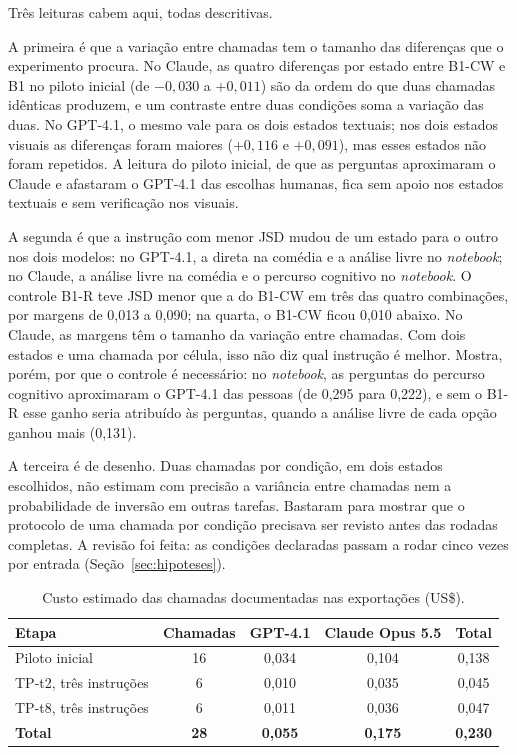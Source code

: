 \documentclass[12pt,oneside,a4paper,chapter=TITLE,english,brazil]{abntex2}
\begin{document}
Três leituras cabem aqui, todas descritivas.

A primeira é que a variação entre chamadas tem o tamanho das diferenças que o experimento procura. No Claude, as quatro diferenças por estado entre B1-CW e B1 no piloto inicial (de $-0{,}030$ a $+0{,}011$) são da ordem do que duas chamadas idênticas produzem, e um contraste entre duas condições soma a variação das duas. No GPT-4.1, o mesmo vale para os dois estados textuais; nos dois estados visuais as diferenças foram maiores ($+0{,}116$ e $+0{,}091$), mas esses estados não foram repetidos. A leitura do piloto inicial, de que as perguntas aproximaram o Claude e afastaram o GPT-4.1 das escolhas humanas, fica sem apoio nos estados textuais e sem verificação nos visuais.

A segunda é que a instrução com menor JSD mudou de um estado para o outro nos dois modelos: no GPT-4.1, a direta na comédia e a análise livre no \textit{notebook}; no Claude, a análise livre na comédia e o percurso cognitivo no \textit{notebook}. O controle B1-R teve JSD menor que a do B1-CW em três das quatro combinações, por margens de 0,013 a 0,090; na quarta, o B1-CW ficou 0,010 abaixo. No Claude, as margens têm o tamanho da variação entre chamadas. Com dois estados e uma chamada por célula, isso não diz qual instrução é melhor. Mostra, porém, por que o controle é necessário: no \textit{notebook}, as perguntas do percurso cognitivo aproximaram o GPT-4.1 das pessoas (de 0,295 para 0,222), e sem o B1-R esse ganho seria atribuído às perguntas, quando a análise livre de cada opção ganhou mais (0,131).

A terceira é de desenho. Duas chamadas por condição, em dois estados escolhidos, não estimam com precisão a variância entre chamadas nem a probabilidade de inversão em outras tarefas. Bastaram para mostrar que o protocolo de uma chamada por condição precisava ser revisto antes das rodadas completas. A revisão foi feita: as condições declaradas passam a rodar cinco vezes por entrada (Seção~\ref{sec:hipoteses}).

\begin{table}[htb]
\centering
\caption{Custo estimado das chamadas documentadas nas exportações (US\$).}
\label{tab:custos}
\footnotesize
\begin{tabular}{@{}lcccc@{}}
\toprule
\textbf{Etapa} & \textbf{Chamadas} & \textbf{GPT-4.1} & \textbf{Claude Opus 5.5} & \textbf{Total} \\
\midrule
Piloto inicial & 16 & 0,034 & 0,104 & 0,138 \\
TP-t2, três instruções & 6 & 0,010 & 0,035 & 0,045 \\
TP-t8, três instruções & 6 & 0,011 & 0,036 & 0,047 \\
\textbf{Total} & \textbf{28} & \textbf{0,055} & \textbf{0,175} & \textbf{0,230} \\
\bottomrule
\end{tabular}
\end{table}
\end{document}
